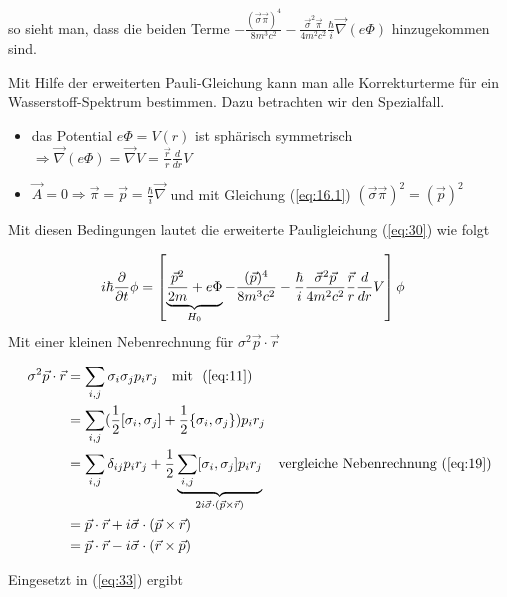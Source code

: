 so sieht man, dass die beiden Terme \( - \frac{(\vec\sigma\vec\pi)^4 }{8m^3c^2} - \frac{\vec\sigma^2\vec\pi }{4m^2c^2}\frac{\hbar}{i}\vec\nabla(e\Phi)\) hinzugekommen sind.

Mit Hilfe der erweiterten Pauli-Gleichung kann man alle Korrekturterme für ein Wasserstoff-Spektrum bestimmen. Dazu betrachten wir den Spezialfall. 

\begin{itemize}
\item das Potential \(e\Phi = V(r)\) ist sphärisch symmetrisch \(\Rightarrow \vec\nabla(e\Phi)= \vec\nabla V=\frac{\vec r}{r}\frac{d}{dr}V \)
\item \(\vec A=0 \Rightarrow \vec \pi = \vec p = \frac{\hbar}{i}\vec \nabla\) und  mit Gleichung (\ref{eq:16.1}) \((\vec\sigma\vec \pi)^2=(\vec p)^2\)
\end{itemize}

Mit diesen Bedingungen lautet die erweiterte Pauligleichung (\ref{eq:30}) wie folgt

\begin{align}
  \label{eq:33}
   i\hbar \pdiff_t \phi &= \left[\underbr{\frac{\vec p^2}{2m}  +e\Phi}_{H_0} - \frac{(\vec p)^4 }{8m^3c^2} -\frac{\hbar}{i} \frac{\vec\sigma^2\vec p }{4m^2c^2}\frac{\vec r}{r}\frac{d}{dr}V \right]\phi
\end{align}
Mit einer kleinen Nebenrechnung für \(\sigma^2\vec p\cdot\vec r\)

\begin{align}
  \label{eq:34}
  \sigma^2\vec p\cdot\vec r &= \sum_{i,j}\sigma_i\sigma_j p_i r_j  \quad\text{mit }~(\ref{eq:11})\notag\\
 &= \sum_{i,j}(\frac{1}{2}[\sigma_i,\sigma_j]+\frac{1}{2}\{\sigma_i,\sigma_j\})  p_i r_j \notag\\
 &=  \sum_{i,j} \delta_{ij} p_i r_j + \frac{1}{2} \underbr{\sum_{i,j}[\sigma_i,\sigma_j] p_i r_j}_{2i\vec\sigma\cdot(\vec p\times\vec r)}  \quad\text{vergleiche Nebenrechnung (\ref{eq:19})} \notag \\
&=\vec p\cdot\vec r + i\vec\sigma\cdot(\vec p\times\vec r) \notag \\
&=\vec p\cdot\vec r - i\vec\sigma\cdot(\vec r\times\vec p) 
\end{align}

Eingesetzt in (\ref{eq:33}) ergibt

